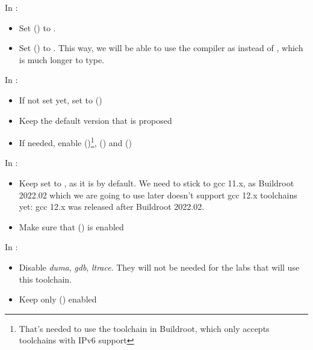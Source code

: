 
In :
\begin{itemize}
\item Set  () to .
\item Set  () to .
      This way, we will be able to use the compiler as 
      instead of , which is
      much longer to type.
\end{itemize}

In :
\begin{itemize}
  \item If not set yet, set  to 
        ()
  \item Keep the default version that is proposed
  \item If needed, enable 
        ()\footnote{
        That's needed to use the toolchain in Buildroot, which only
        accepts toolchains with IPv6 support},
         () and
        ()
\end{itemize}

In :
\begin{itemize}
  \item Keep  set to , as it is by
        default. We need to stick to gcc 11.x, as Buildroot 2022.02
        which we are going to use later doesn't support gcc 12.x
        toolchains yet: gcc 12.x was released after Buildroot 2022.02.
  \item Make sure that  () is enabled
\end{itemize}

In :
\begin{itemize}
\item Disable {\em duma}, {\em gdb}, {\em ltrace}. They will not be
  needed for the labs that will use this toolchain.
\item Keep only  () enabled
\end{itemize}

